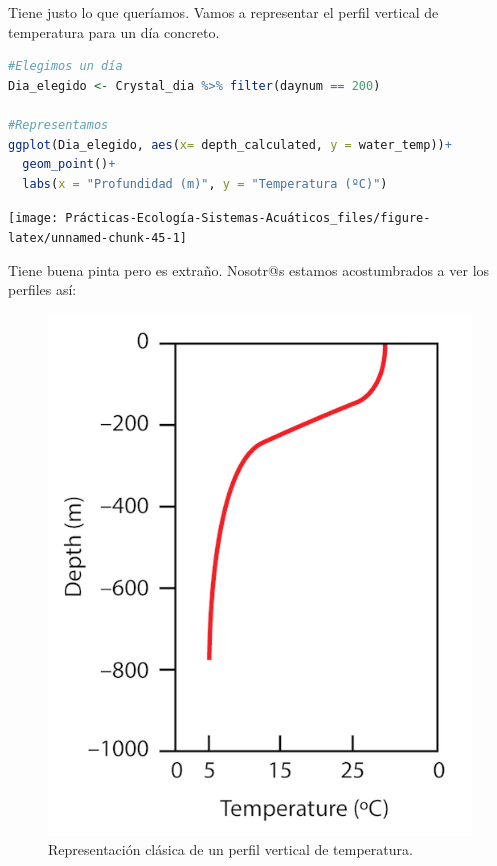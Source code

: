 \documentclass[
]{book}
\begin{document}
Tiene justo lo que queríamos. Vamos a representar el perfil vertical de temperatura para un día concreto.

\begin{lstlisting}[language=R]
#Elegimos un día
Dia_elegido <- Crystal_dia %>% filter(daynum == 200)

#Representamos
ggplot(Dia_elegido, aes(x= depth_calculated, y = water_temp))+
  geom_point()+
  labs(x = "Profundidad (m)", y = "Temperatura (ºC)")
\end{lstlisting}

\texttt{[image: Prácticas-Ecología-Sistemas-Acuáticos\_files/figure-latex/unnamed-chunk-45-1]}

Tiene buena pinta pero es extraño. Nosotr@s estamos acostumbrados a ver los perfiles así:

\begin{figure}

{\centering \includegraphics[width=1\linewidth]{Img/Perfil2} 

}

\caption{Representación clásica de un perfil vertical de temperatura.}\label{fig:unnamed-chunk-46}
\end{figure}
\end{document}
